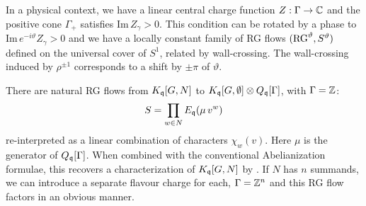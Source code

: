 \documentclass[12pt]{amsart}
\begin{document}
\begin{remark} In a physical context, we have a linear central charge function $Z: \Gamma \to \mathbb{C}$ and the positive cone $\Gamma_+$ satisfies 
$\mathrm{Im} \, Z_\gamma>0$. This condition can be rotated by a phase to $\mathrm{Im}\,  e^{- i \vartheta} Z_\gamma>0$
and we have a locally constant family of RG flows $(\mathrm{RG}^\vartheta,S^\vartheta)$ defined on the universal cover of $S^1$,
related by wall-crossing. The wall-crossing induced by $\rho^{\pm 1}$ corresponds to a shift by $\pm \pi$ of $\vartheta$. \end{remark} 

\begin{remark}
	There are natural RG flows from $K_{\mathfrak{q}}[G,N]$ to $K_{\mathfrak{q}}[G,\emptyset] \otimes Q_{\mathfrak{q}}[\Gamma]$, with $\Gamma = \mathbb{Z}$:
	\begin{equation}
		S = \prod_{w \in N} E_{\mathfrak{q}}(\mu \,v^w)
	\end{equation} 
	re-interpreted as a linear combination of characters $\chi_w(v)$. Here $\mu$ is the generator of $Q_{\mathfrak{q}}[\Gamma]$. When combined with the conventional Abelianization formulae, this recovers a characterization of $K_{\mathfrak{q}}[G,N]$ by \cite{schrader2026ktheoreticcoulombbranchesquiver}. If $N$ has $n$ summands, we can introduce a separate flavour charge for each, $\Gamma = \mathbb{Z}^n$ and 
	this RG flow factors in an obvious manner. 
\end{remark}

\end{document}
